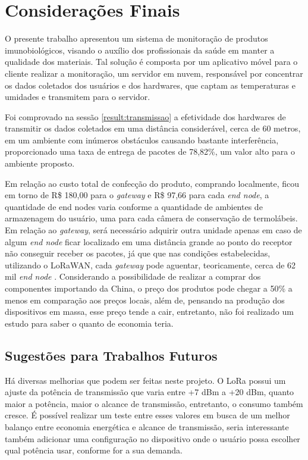 \chapter{Considerações Finais}
\label{cap:conclusao}
O presente trabalho apresentou um sistema de monitoração de produtos imunobiológicos, visando o auxílio dos profissionais da saúde em manter a qualidade dos materiais. Tal solução é composta por um aplicativo móvel para o cliente realizar a monitoração, um servidor em nuvem, responsável por concentrar os dados coletados dos usuários e dos hardwares, que captam as temperaturas e umidades e transmitem para o servidor.

Foi comprovado na sessão \ref{result:transmissao} a efetividade dos hardwares de transmitir os dados coletados em uma distância considerável, cerca de 60 metros, em um ambiente com inúmeros obstáculos causando bastante interferência, proporcionado uma taxa de entrega de pacotes de 78,82\%, um valor alto para o ambiente proposto.
 
Em relação ao custo total de confecção do produto, comprando localmente, ficou  em torno de R\$ 180,00 para o \textit{gateway} e R\$ 97,66 para cada \textit{end node}, a quantidade de end nodes varia conforme a quantidade de ambientes de armazenagem do usuário, uma para cada câmera de conservação de termolábeis. Em relação ao \textit{gateway}, será necessário adquirir outra unidade apenas em caso de algum \textit{end node} ficar localizado em uma distância grande ao ponto do receptor não conseguir receber os pacotes, já que que nas condições estabelecidas, utilizando o LoRaWAN, cada \textit{gateway} pode aguentar, teoricamente, cerca de 62 mil \textit{end node} \cite{lora2021specification}. Considerando a possibilidade de realizar a comprar dos componentes importando da China, o preço dos produtos pode chegar a 50\% a menos em comparação aos preços locais, além de, pensando na produção dos dispositivos em massa, esse preço tende a cair, entretanto, não foi realizado um estudo para saber o quanto de economia teria.


\section{Sugestões para Trabalhos Futuros}
\label{conclusao:futuros}
Há diversas melhorias que podem ser feitas neste projeto. O LoRa possui um ajuste da potência de transmissão que varia entre +7 dBm a +20 dBm, quanto maior a potência, maior o alcance de transmissão, entretanto, o consumo também cresce. É possível realizar um teste entre esses valores em busca de um melhor balanço entre economia energética e alcance de transmissão, seria interessante também adicionar uma configuração no dispositivo onde o usuário possa escolher qual potência usar, conforme for a sua demanda.

